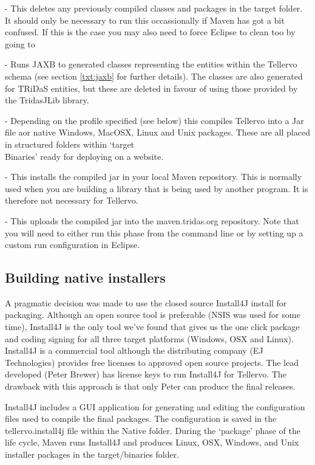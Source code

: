 \begin{description*}
 \item[clean] - This deletes any previously compiled classes and packages in the target folder.  It should only be necessary to run this occassionally if Maven has got a bit confused.  If this is the case you may also need to force Eclipse to clean too by going to 
 \item[generate-sources] - Runs JAXB to generated classes representing the entities within the Tellervo schema (see section \ref{txt:jaxb} for further details).  The classes are also generated for TRiDaS entities, but these are deleted in favour of using those provided by the TridasJLib library.
 \item[package] - Depending on the profile specified (see below) this compiles Tellervo into a Jar file aor native Windows, MacOSX, Linux and Unix packages.  These are all placed in structured folders within `target\\Binaries' ready for deploying on a website.  
 \item[install] - This installs the compiled jar in your local Maven repository. This is normally used when you are building a library that is being used by another program.  It is therefore not necessary for Tellervo.
 \item[deploy] - This uploads the compiled jar into the maven.tridas.org repository.  Note that you will need to either run this phase from the command line or by setting up a custom run configuration in Eclipse.
\end{description*}


\subsection{Building native installers}

A pragmatic decision was made to use the closed source Install4J install for packaging. Although an open source tool is preferable (NSIS was used for some time), Install4J is the only tool we've found that gives us the one click package and coding signing for all three target platforms (Windows, OSX and Linux). Install4J is a commercial tool although the distributing company (EJ Technologies) provides free licenses to approved open source projects. The lead developed (Peter Brewer) has license keys to run Install4J for Tellervo. The drawback with this approach is that only Peter can produce the final releases.

Install4J includes a GUI application for generating and editing the configuration files used to compile the final packages. The configuration is saved in the tellervo.install4j file within the Native folder. During the `package' phase of the life cycle, Maven runs Install4J and produces Linux, OSX, Windows, and Unix installer packages in the target/binaries folder.

